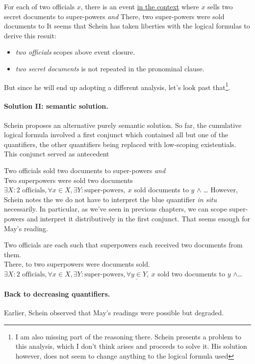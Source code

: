 \documentclass[english]{article}
\newcommand{\fg}{\color{darkred}}
\newcommand{\bg}{\color{blueish}}
\begin{document}
\ex
For each of two officials $x$, there is an event \underline{in the context} where $x$ sells two secret documents to super-powers \emph{and}
There, two super-powers were sold documents to
\xe
%
It seems that Schein has taken liberties with the logical formulas to derive this resuit:

\begin{itemize}
\item \emph{two officials} scopes above event closure.
\item \emph{two secret documents} is not repeated in the pronominal clause.
\end{itemize}
%
But since he will end up adopting a different analysis, let's look past that\footnote{
I am also missing part of the reasoning there. Schein presents a problem to this analysis, which I don't think arises and proceeds to solve it. His solution however, does not seem to change anything to the logical formula used
}. 

\paragraph{Solution II: semantic solution.}
Schein proposes an alternative purely semantic solution. So far, the cumulative logical formula involved a first conjunct which contained all but one of the quantifiers, the other quantifiers being replaced with low-scoping existentials. This conjunct served as antecedent

\pex
\a
{\fg Two officials} sold two documents to {\bg super-powers} \emph{and}\\
Two superpowers were sold two documents
\a
$\exists X : 2\text{ officials}, \forall x\in X, \exists Y : \text{super-powers},\ x$ sold documents to $y$ $\wedge$
\ldots
\xe
%
However, Schein notes the we do not have to interpret the {\bg blue} quantifier \emph{in situ} necessarily. In particular, as we've seen in previous chapters, we can scope {\bg super-powers} and interpret it distributively in the first conjunct. That seems enough for May's reading.

\pex
\a
Two officials are each such that superpowers each received two documents from them.\\
There, to two superpowers were documents sold.
\a
$\exists X : 2\text{ officials}, \forall x\in X, \exists Y : \text{super-powers}, \underline{\forall y\in Y},\ x$ sold two documents to $y$ $\wedge$\ldots
\xe
%

\paragraph{Back to decreasing quantifiers.}
Earlier, Schein observed that May's readings were possible but degraded.
\end{document}
